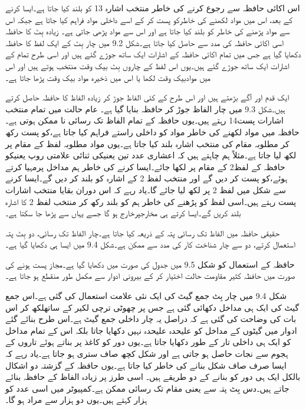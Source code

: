 	اس اکائی حافظہ سے رجوع کرنے کی خاطر منتخب اشارہ 13 کو بلند کیا جاتا ہے۔ایسا کرنے کے بعد، اس میں مواد لکھنے کی خاطرکو پست کر کے اسے داخلی مواد فراہم کیا جاتا ہے جبکہ اس سے مواد پڑھنے کی خاطر کو بلند کیا جاتا ہے اور اس سے مواد پڑھی جاتی ہے۔
	زیادہ بِٹ کا حافظہ اسی اکائی حافظہ کی مدد سے حاصل کیا جاتا ہے۔شکل 9.2 میں چار بِٹ کے ایک لفظ کا حافظہ دکھایا گیا ہے جس میں تمام اکائی حافظہ کے  اشارات ایک ساتھ جوڑے گئے ہیں اور اسی طرح تمام کے اشارات ایک ساتھ جوڑے گئے ہیں۔یوں اس لفظ کے چاروں بِٹ بیک وقت منتخب ہوتے ہیں اور اس میں موادبیک وقت لکھا یا اس میں ذخیرہ مواد بیک وقت پڑھا جاتا ہے۔

	ایک قدم اور آگے بڑھتے ہیں اور اس طرح کے کئی الفاظ جوڑ کر زیادہ الفاظ کا حافظہ حاصل کرتے ہیں۔شکل 9.3 میں چار الفاظ جوڑ کر حافظہ بنایا گیا ہے۔
	عام حالت میں تمام منتخب اشارات پست14 رہتے ہیں۔یوں حافظہ کے تمام الفاظ تک رسائی نا ممکن ہوتی ہے۔حافظہ میں مواد لکھنے کی خاطر مواد کو داخلی راستے فراہم کیا جاتا ہے،کو پست رکھ کر  مطلوبہ مقام کی منتخب اشارہ بلند کیا جاتا ہے۔یوں مواد مطلوبہ لفظ کے مقام پر لکھ لیا جاتا ہے۔مثلاً ہم چاہتے ہیں کہ اعشاری عدد تین یعنیکی ثنائی علامتی روپ یعنیکو حافظہ کے لفظ2 کے مقام پر لکھا جائے۔ایسا کرنے کی خاطر ہم مداخل پرمہیا کرتے ہوئے،کو پست کر دیں گے اور منتخب لفظ 2 کے اشارہ کو بلند کر دیں گے۔ایسا کرنے سے شکل میں لفظ 2 پر لکھ لیا جائے گا۔یاد رہے کہ اس دوران بقایا منتخب اشارات پست رہتے ہیں۔اسی لفظ کو پڑھنے کی خاطر ہم کو بلند رکھ کر منتخب لفظ 2 کا اشارہ بلند کریں گے۔ایسا کرتے ہی مخارجپرخارج ہو گا جسے یہاں سے پڑھا جا سکتا ہے۔

	حقیقی حافظہ میں الفاظ تک رسائی پتہ کے ذریعہ کیا جاتا ہے۔چار الفاظ تک رسائی، دو بِٹ پتہ  استعمال کرتے، دو سے چار شناخت کار کی مدد سے ممکن ہے۔شکل 9.4 میں ایسا ہی دکھایا گیا ہے۔


	حافظہ کے استعمال کو شکل 9.5 میں جدول کی صورت میں دکھایا گیا ہے۔مجاز پست ہونے کی صورت میں حافظہ کثیر مقاومت حالت اختیار کر کے بیرونی ادوار سے مکمل طور منقطع ہو جاتا ہے۔


	شکل 9.4 میں چار بِٹ جمع گیٹ کی ایک نئی علامت استعمال کی گئی ہے۔اس جمع گیٹ کی ایک ہی مداخل دکھائی گئی ہے جس پر چھوٹی ترچی لکیر کے ساتھلکھ کر اس بات کی وضاحت کی گئی ہے کہ دراصل یہ چار داخلی جمع گیٹ ہے۔اس طرح بنائے گئے ادوار میں گیٹوں کے مداخل کو علیحدہ علیحدہ نہیں دکھایا جاتا بلکہ اس کے تمام مداخل کو ایک ہی داخلی تار کے طور دکھایا جاتا ہے۔یوں دور کو کاغذ پر بناتے ہوئے تاروں کے ہجوم سے نجات حاصل ہو جاتی ہے اور شکل کچھ صاف ستری ہو جاتا ہے۔یاد رہے کہ ایسا صرف صاف شکل بنانے کی خاطر کیا جاتا ہے۔یوں حافظہ کے گزشتہ دو اشکال بالکل ایک ہی دور کو بنانے کے دو طریقے ہیں۔
	اسی طرز پر زیادہ الفاظ کے حافظہ بنائے جاتے ہیں۔دس بِٹ پتہ سے  یعنی مقام تک رسائی ممکن ہے۔کمپیوٹر میں اسی عدد کو ہزار کہتے ہیں۔یوں دو ہزار سے مراد ہو گا۔


